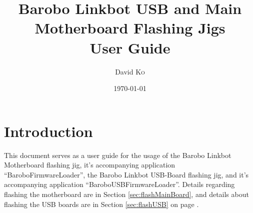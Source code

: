 \documentclass{article}
\title{Barobo Linkbot USB and Main Motherboard Flashing Jigs \\ User Guide} %
\author{David \textsc{Ko}} %
\date{\today} %
\begin{document}
\maketitle %

\section{Introduction}
This document serves as a user guide for the usage of the Barobo Linkbot Motherboard flashing
jig, it's accompanying application ``BaroboFirmwareLoader'', the Barobo Linkbot USB-Board 
flashing jig, and it's accompanying application ``BaroboUSBFirmwareLoader''. Details regarding
flashing the motherboard are in Section \ref{sec:flashMainBoard}, and details about
flashing the USB boards are in Section \ref{sec:flashUSB} on page \pageref{sec:flashUSB}.
\end{document}
